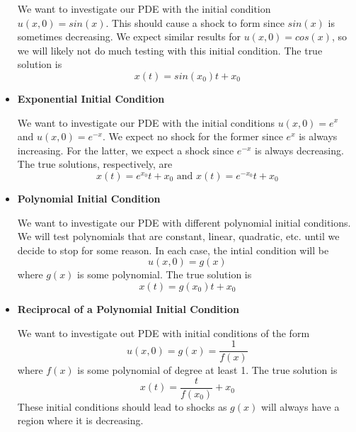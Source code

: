\documentclass{myproject}
\begin{document}
\begin{itemize}
	We want to investigate our PDE with the initial condition $u(x, 0) = sin(x)$. This should cause a shock to form since $sin(x)$ is sometimes decreasing. We expect similar results for $u(x, 0) = cos(x)$, so we will likely not do much testing with this initial condition. The true solution is
	\begin{equation}
		x(t) = sin(x_0){t} + x_0
	\end{equation}

	\item \textbf{Exponential Initial Condition}

	We want to investigate our PDE with the initial conditions $u(x, 0) = e^x$ and $u(x, 0) = e^{-x}$. We expect no shock for the former since $e^x$ is always increasing. For the latter, we expect a shock since $e^{-x}$ is always decreasing. The true solutions, respectively, are 
	\begin{equation}
		x(t) = e^{x_0}{t} + x_0 \text{ and } x(t) = e^{-x_0}{t} + x_0
	\end{equation}

	\item \textbf{Polynomial Initial Condition}

	We want to investigate our PDE with different polynomial initial conditions. We will test polynomials that are constant, linear, quadratic, etc. until we decide to stop for some reason. In each case, the intial condition will be
	\begin{equation}
		u(x, 0) = g(x)
	\end{equation}
	where $g(x)$ is some polynomial. The true solution is
	\begin{equation}
		x(t) = g(x_0){t} + x_0
	\end{equation}

	\item \textbf{Reciprocal of a Polynomial Initial Condition}

	We want to investigate out PDE with initial conditions of the form
	\begin{equation}
		u(x, 0) = g(x) = \frac{1}{f(x)}
	\end{equation}
	where $f(x)$ is some polynomial of degree at least 1. The true solution is
	\begin{equation}
		x(t) = \frac{t}{f(x_0)} + x_0
	\end{equation}
	These initial conditions should lead to shocks as $g(x)$ will always have a region where it is decreasing.

\end{itemize}
\end{document}

